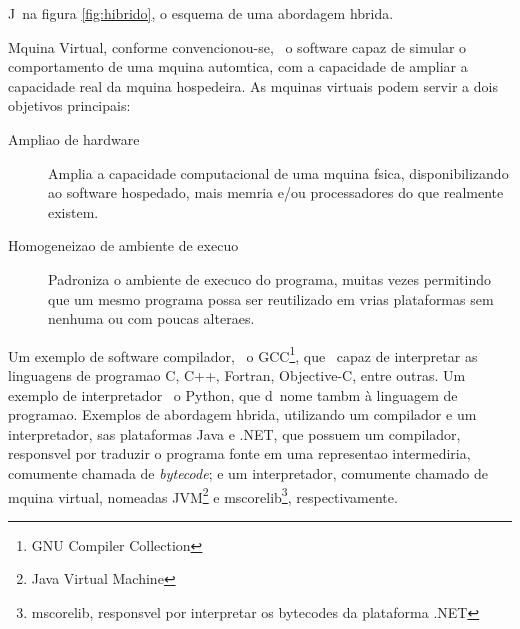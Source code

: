 
J\ah\ na figura \ref{fig:hibrido}, o esquema de uma abordagem h\ih brida.

M\ah quina Virtual, conforme convencionou-se, \eh\ o software capaz de simular o comportamento de uma m\ah quina autom\ah tica, com a capacidade de ampliar a capacidade real da m\ah quina hospedeira.
As m\ah quinas virtuais podem servir a dois objetivos principais:
\begin{description}
\item[Amplia\ca o de hardware] Amplia a capacidade computacional de uma m\ah quina f\ih sica, disponibilizando ao software hospedado, mais mem\oh ria e/ou processadores do que realmente existem.
\item[Homogeneiza\ca o de ambiente de execu\ca o] Padroniza o ambiente de execuc\ca o do programa, muitas vezes permitindo que um mesmo programa possa ser reutilizado em v\ah rias plataformas sem nenhuma ou com poucas altera\co es.
\end{description}

Um exemplo de software compilador, \eh\ o {GCC\footnote{GNU Compiler Collection}}, que \eh\ capaz de interpretar as linguagens de programa\ca o C, C++, Fortran, Objective-C, entre outras.
Um exemplo de interpretador \eh\ o Python, que d\ah\ nome tamb\eh m \`a linguagem de programa\ca o.
Exemplos de abordagem h\ih brida, utilizando um compilador e um interpretador, s\ao as plataformas Java e .NET, que possuem um compilador, respons\ah vel por traduzir o programa fonte em uma representa\ca o intermedi\ah ria, comumente chamada de \emph{bytecode}; e um interpretador, comumente chamado de m\ah quina virtual, nomeadas {JVM\footnote{Java Virtual Machine}} e {mscorelib\footnote{mscorelib, respons\ah vel por interpretar os bytecodes da plataforma .NET}}, respectivamente.
